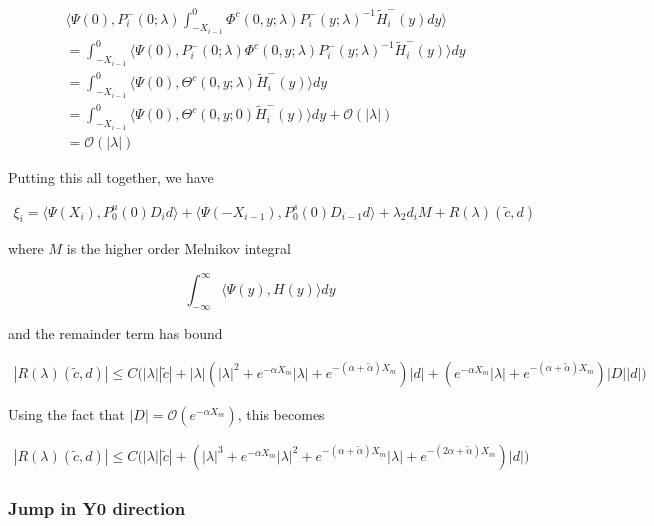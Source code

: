 \documentclass[12pt]{article}
\begin{document}
\begin{enumerate}
\begin{align*}
&\langle \Psi(0), P_i^-(0; \lambda)
\int_{-X_{i-1}}^0 \Phi^c(0, y; \lambda) P_i^-(y; \lambda)^{-1} \tilde{H}_i^-(y) dy \rangle \\
&= \int_{-X_{i-1}}^0 \langle \Psi(0), P_i^-(0; \lambda) \Phi^c(0, y; \lambda) P_i^-(y; \lambda)^{-1} \tilde{H}_i^-(y) \rangle dy \\
&= \int_{-X_{i-1}}^0 \langle \Psi(0), \Theta^c(0, y; \lambda) \tilde{H}_i^-(y) \rangle dy \\
&= \int_{-X_{i-1}}^0 \langle \Psi(0), \Theta^c(0, y; 0) \tilde{H}_i^-(y) \rangle dy + \mathcal{O}(|\lambda|) \\
&= \mathcal{O}(|\lambda|)
\end{align*}

\end{enumerate}

Putting this all together, we have

\begin{align*}
\xi_i = \langle \Psi(X_i), P_0^u(0) D_i d \rangle
+ \langle \Psi(-X_{i-1}), P_0^s(0) D_{i-1} d \rangle 
+ \lambda_2 d_i M + R(\lambda)(\tilde{c}, d)
\end{align*}

where $M$ is the higher order Melnikov integral

\[
\int_{-\infty}^\infty \langle \Psi(y), H(y) \rangle dy 
\]

and the remainder term has bound

\begin{align*}
|R(\lambda)(\tilde{c}, d)| \leq C \Big(
|\lambda||\tilde{c}| + |\lambda|(|\lambda|^2 + e^{-\alpha X_m}|\lambda| + e^{-(\alpha + \tilde{\alpha}) X_m})|d| + (e^{-\alpha X_m} |\lambda| + e^{-(\alpha + \tilde{\alpha}) X_m})|D||d|
 \Big)
\end{align*}

Using the fact that $|D| = \mathcal{O}(e^{-\alpha X_m})$, this becomes

\begin{align*}
|R(\lambda)(\tilde{c}, d)| \leq C \Big(
|\lambda||\tilde{c}| + (|\lambda|^3 + e^{-\alpha X_m}|\lambda|^2 + e^{-(\alpha + \tilde{\alpha}) X_m}|\lambda| + e^{-(2 \alpha + \tilde{\alpha}) X_m})|d|
 \Big)
\end{align*}

\subsubsection*{Jump in Y0 direction}
\end{document}
